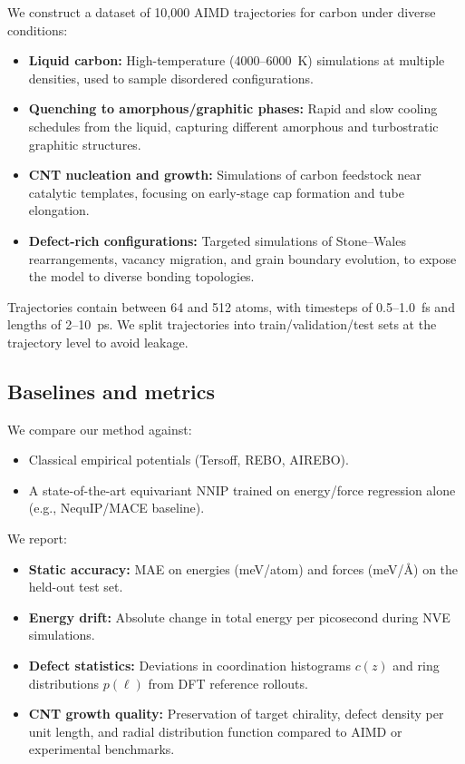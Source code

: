 \documentclass{article}
\begin{document}
We construct a dataset of 10{,}000 AIMD trajectories for carbon under diverse conditions:
\begin{itemize}
    \item \textbf{Liquid carbon:} High-temperature (4000--6000~K) simulations at multiple densities, used to sample disordered configurations.
    \item \textbf{Quenching to amorphous/graphitic phases:} Rapid and slow cooling schedules from the liquid, capturing different amorphous and turbostratic graphitic structures.
    \item \textbf{CNT nucleation and growth:} Simulations of carbon feedstock near catalytic templates, focusing on early-stage cap formation and tube elongation.
    \item \textbf{Defect-rich configurations:} Targeted simulations of Stone--Wales rearrangements, vacancy migration, and grain boundary evolution, to expose the model to diverse bonding topologies.
\end{itemize}
Trajectories contain between 64 and 512 atoms, with timesteps of 0.5--1.0~fs and lengths of 2--10~ps. We split trajectories into train/validation/test sets at the trajectory level to avoid leakage.

\subsection{Baselines and metrics}

We compare our method against:
\begin{itemize}
    \item Classical empirical potentials (Tersoff, REBO, AIREBO).
    \item A state-of-the-art equivariant NNIP trained on energy/force regression alone (e.g., NequIP/MACE baseline).
\end{itemize}

We report:
\begin{itemize}
    \item \textbf{Static accuracy:} MAE on energies (meV/atom) and forces (meV/\AA{}) on the held-out test set.
    \item \textbf{Energy drift:} Absolute change in total energy per picosecond during NVE simulations.
    \item \textbf{Defect statistics:} Deviations in coordination histograms $c(z)$ and ring distributions $p(\ell)$ from DFT reference rollouts.
    \item \textbf{CNT growth quality:} Preservation of target chirality, defect density per unit length, and radial distribution function compared to AIMD or experimental benchmarks.
\end{itemize}
\end{document}
